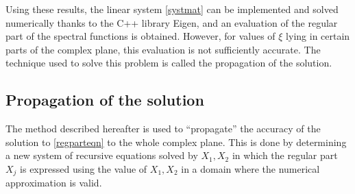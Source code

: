  Using these results, the linear system \eqref{systmat} can be implemented and solved numerically thanks to the C++ library Eigen, and an evaluation of the regular part of the spectral functions is obtained. However, for values of $\xi$ lying in certain parts of the complex plane, this evaluation is not sufficiently accurate. The technique used to solve this problem is called the propagation of the solution.

\subsection{Propagation of the solution}
\label{propag}
The method described hereafter is used to ``propagate''  the accuracy of the solution to \eqref{regparteqn} to the whole complex plane. This is done by determining a new system of recursive equations solved by $X_1, X_2$ in which the regular part $X_j$ is expressed using the value of $X_1, X_2$ in a domain where the numerical approximation is valid.

